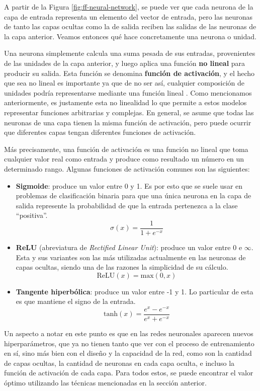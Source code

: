 \documentclass[../../main.tex]{subfiles}
\begin{document}
A partir de la Figura \ref{fig:ff-neural-network}, se puede ver que cada neurona de la
capa de entrada representa un elemento del vector de entrada, pero las neuronas de tanto
las capas ocultas como la de salida reciben las salidas de las neuronas de la capa
anterior. Veamos entonces qué hace concretamente una neurona o unidad.

Una neurona simplemente calcula una suma pesada de sus entradas, provenientes de las
unidades de la capa anterior, y luego aplica una función \textbf{no lineal} para producir
su salida. Esta función se denomina \textbf{función de activación}, y el hecho que sea no
lineal es importante ya que de no ser así, cualquier composición de unidades podría
representarse mediante una función lineal \cite{ai-a-modern-approach}. Como mencionamos
anteriormente, es justamente esta no linealidad lo que permite a estos modelos representar
funciones arbitrarias \cite{ai-a-modern-approach} y complejas. En general, se asume que
todas las neuronas de una capa tienen la misma función de activación, pero puede ocurrir
que diferentes capas tengan diferentes funciones de activación.

Más precisamente, una función de activación es una función no lineal que toma cualquier
valor real como entrada y produce como resultado un número en un determinado rango.
Algunas funciones de activación comunes son las siguientes:
\begin{itemize}[itemsep=0.1cm]
    \item \textbf{Sigmoide}: produce un valor entre 0 y 1. Es por esto que se suele usar
    en problemas de clasificación binaria para que una única neurona en la capa de salida
    represente la probabilidad de que la entrada pertenezca a la clase ``positiva''.
    \[\sigma(x)=\frac{1}{1+e^{-x}}\]
    \item \textbf{ReLU} (abreviatura de \textit{Rectified Linear Unit}): produce un valor
    entre 0 e \(\infty\). Esta y sus variantes son las más utilizadas actualmente en las
    neuronas de capas ocultas, siendo una de las razones la simplicidad de su cálculo.
    \[\text{ReLU}(x) = \text{max}(0, x)\]
    \item \textbf{Tangente hiperbólica}: produce un valor entre -1 y 1. Lo particular de
    esta es que mantiene el signo de la entrada.
    \[\text{tanh}(x)=\frac{e^x - e^{-x}}{e^x + e^{-x}}\]
\end{itemize}

Un aspecto a notar en este punto es que en las redes neuronales aparecen nuevos
hiperparámetros, que ya no tienen tanto que ver con el proceso de entrenamiento en sí,
sino más bien con el diseño y la capacidad de la red, como son la cantidad de capas
ocultas, la cantidad de neuronas en cada capa oculta, e incluso la función de activación
de cada capa. Para todos estos, se puede encontrar el valor óptimo utilizando las técnicas
mencionadas en la sección anterior.
\end{document}
